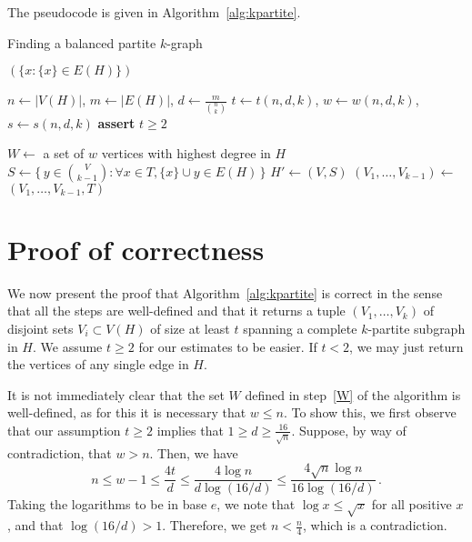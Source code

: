 The pseudocode is given in Algorithm~\ref{alg:kpartite}.

\begin{algorithm}[H]
    \caption{Finding a balanced partite $k$-graph}
    \label{alg:kpartite}
    \begin{algorithmic}[1]
                \State \Return $(\{x \colon \{x\} \in E(H)\})$
            \EndIf

            \State $n \gets |V(H)|$, $m \gets |E(H)|$, $d \gets \frac{m}{\binom{n}{k}}$
            \State $t \gets t(n, d, k)$, $w \gets w(n, d, k)$, $s \gets s(n, d, k)$
            \State \textbf{assert} $t \ge 2$

            \State $W \gets$ a set of $w$ vertices with highest degree in $H$
                \State $S \gets \{\,y \in \binom{V}{k-1} \colon \forall x \in T, \{x\} \cup y \in E(H)\,\}$
                    \State $H' \gets (V, S)$  
                    \State $(V_1, \dots, V_{k-1}) \gets$  \label{recurse}
                    \State \Return $(V_1, \dots, V_{k-1}, T)$
                \EndIf
            \EndFor
        \EndFunction
    \end{algorithmic}
\end{algorithm}

\section{Proof of correctness}\label{sec:correctness}

We now present the proof that Algorithm~\ref{alg:kpartite} is correct in the sense that
all the steps are well-defined and that it returns a tuple $(V_1, \dots, V_k)$ of disjoint sets $V_i \subset V(H)$
of size at least $t$ spanning a complete $k$-partite subgraph in $H$.
We assume $t \ge 2$ for our estimates to be easier.
If $t < 2$, we may just return the vertices of any single edge in $H$.

It is not immediately clear that the set $W$ defined in step~\ref{W} of the algorithm
is well-defined, as for this it is necessary that $w \leq n$.
To show this, we first observe that our assumption $t \geq 2$
implies that $ 1 \geq d \geq \frac{16}{\sqrt{n}}$.
Suppose, by way of contradiction, that $w > n$.
Then, we have
\[
    n \leq w - 1 \leq \frac{4t}{d} \leq \frac{4\log n}{d\log(16/d)} \leq \frac{4 \sqrt{n} \log n }{16 \log(16/d)}\,.
\]
Taking the logarithms to be in base $e$, we note that $\log x \leq \sqrt{x}$ for all positive $x$,
and that $\log(16/d) > 1$.
Therefore, we get $n < \frac{n}{4}$, which is a contradiction.

